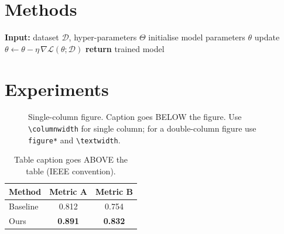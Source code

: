\documentclass[10pt,journal,final]{IEEEtran}
\begin{document}
\section{Methods}

\begin{algorithm}[t]
\caption{Outline of the proposed method}
\label{alg:method}
\begin{algorithmic}[1]
\State \textbf{Input:} dataset $\mathcal{D}$, hyper-parameters $\Theta$
\State initialise model parameters $\theta$
    \State update $\theta \leftarrow \theta - \eta \,\nabla \mathcal{L}(\theta;\mathcal{D})$
\EndWhile
\State \textbf{return} trained model
\end{algorithmic}
\end{algorithm}

\section{Experiments}

\begin{figure}[t]
\centering
\fbox{\rule{0pt}{2.5cm}\rule{\columnwidth}{0pt}}
\caption{Single-column figure. Caption goes BELOW the figure. Use
\texttt{\textbackslash columnwidth} for single column; for a double-column
figure use \texttt{figure*} and \texttt{\textbackslash textwidth}.}
\label{fig:result}
\end{figure}

\begin{table}[t]
\caption{Table caption goes ABOVE the table (IEEE convention).}
\label{tab:results}
\centering
\begin{tabular}{lcc}
\toprule
Method   & Metric A       & Metric B       \\
\midrule
Baseline & 0.812          & 0.754          \\
Ours     & \textbf{0.891} & \textbf{0.832} \\
\bottomrule
\end{tabular}
\end{table}
\end{document}
